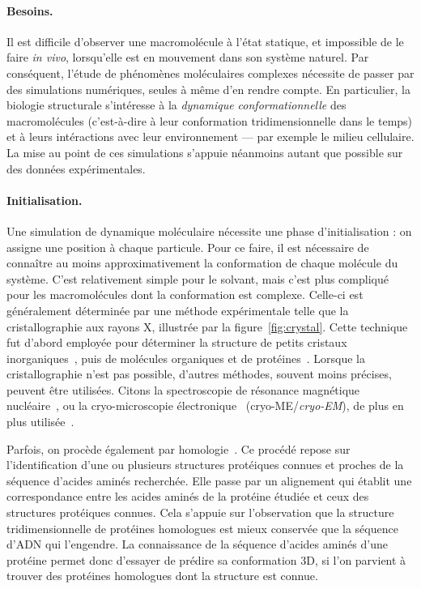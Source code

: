 	\paragraph{Besoins.} Il est difficile d'observer une macromolécule à l'état statique, et impossible de le faire \emph{in vivo}, lorsqu'elle est en mouvement dans son système naturel. Par conséquent, l'étude de phénomènes moléculaires complexes nécessite de passer par des simulations numériques, seules à même d'en rendre compte. En particulier, la biologie structurale s'intéresse à la \emph{dynamique conformationnelle} des macromolécules (c'est-à-dire à leur conformation tridimensionnelle dans le temps) et à leurs intéractions avec leur environnement --- par exemple le milieu cellulaire. La mise au point de ces simulations s'appuie néanmoins autant que possible sur des données expérimentales.
	
	\paragraph{Initialisation.}
	Une simulation de dynamique moléculaire nécessite une phase d'initialisation : on assigne une position à chaque particule. Pour ce faire, il est nécessaire de connaître au moins approximativement la conformation de chaque molécule du système. C'est relativement simple pour le solvant, mais c'est plus compliqué pour les macromolécules dont la conformation est complexe. Celle-ci est généralement déterminée par une méthode expérimentale telle que la cristallographie aux rayons X, illustrée par la figure~\ref{fig:crystal}. Cette technique fut d'abord employée pour déterminer la structure de petits cristaux inorganiques~\cite{friedrich1912sitzungsberichte, bragg1914reflexion, bragg1913structure, dickinson1923crystal}, puis de molécules organiques et de protéines~\cite{de1925interpretation, crowfoot1935x, kendrew1958three}. Lorsque la cristallographie n'est pas possible, d'autres méthodes, souvent moins précises, peuvent être utilisées. Citons la spectroscopie de résonance magnétique nucléaire~\cite{clore1989determination, wuthrich1990protein, clore1991structures, wuthrich2001way}, ou la cryo-microscopie électronique~\cite{adrian1984cryo} (cryo-ME/\emph{cryo-EM}), de plus en plus utilisée~\cite{kuhlbrandt2014cryo, callaway2015revolution, dellisanti2015barrier, bartesaghi20152}.
	
	Parfois, on procède également par homologie~\cite{marti2000comparative, kaczanowski2010similar}. Ce procédé repose sur l'identification d'une ou plusieurs structures protéiques connues et proches de la séquence d'acides aminés recherchée. Elle passe par un alignement qui établit une correspondance entre les acides aminés de la protéine étudiée et ceux des structures protéiques connues. Cela s'appuie sur l'observation que la structure tridimensionnelle de protéines homologues est mieux conservée que la séquence d'ADN qui l'engendre. La connaissance de la séquence d'acides aminés d'une protéine permet donc d'essayer de prédire sa conformation 3D, si l'on parvient à trouver des protéines homologues dont la structure est connue.
	
